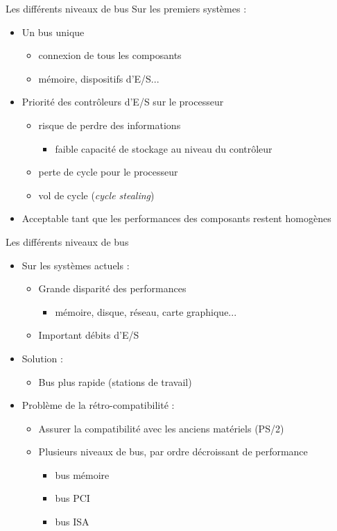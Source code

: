 \begin{frame}{Les différents niveaux de bus}
Sur les premiers systèmes :
\begin{itemize}
\item Un bus unique
\begin{itemize}
\item connexion de tous les composants 
\item mémoire, dispositifs d'E/S...
\end{itemize}
\item Priorité des contrôleurs d'E/S sur le processeur
\begin{itemize}
\item risque de perdre des informations
\begin{itemize}
\item faible capacité de stockage au niveau du contrôleur
\end{itemize}

\item perte de cycle pour le processeur
\item vol de cycle (\textit{cycle stealing})
\end{itemize}
\item Acceptable tant que les performances des composants restent homogènes
\end{itemize}
\end{frame}


\begin{frame}{Les différents niveaux de bus}
\begin{itemize}
\item Sur les systèmes actuels :
  \begin{itemize}
    \item Grande disparité des performances
      \begin{itemize}
        \item mémoire, disque, réseau, carte graphique...
      \end{itemize}
    \item Important débits d'E/S
  \end{itemize}
    \item Solution :
    \begin{itemize}
	\item Bus plus rapide (stations de travail)
    \end{itemize}


  \item Problème de la rétro-compatibilité :
  \begin{itemize}
    \item Assurer la compatibilité avec les anciens matériels (PS/2)
    \item Plusieurs niveaux de bus, par ordre décroissant de performance
    \begin{itemize}
      \item bus mémoire
      \item bus PCI
      \item bus ISA
    \end{itemize}
  \end{itemize}
\end{itemize}
\end{frame}


